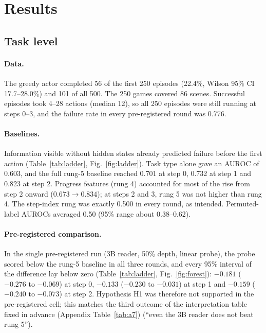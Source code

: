 \documentclass[11pt]{article}
\begin{document}
\section{Results}
\subsection{Task level}\label{sec:task}
\paragraph{Data.} The greedy actor completed 56 of the first 250 episodes (22.4\%, Wilson 95\% CI 17.7--28.0\%) and 101 of all 500.
The 250 games covered 86 scenes. Successful episodes took 4--28 actions (median 12), so all 250 episodes were still running at steps 0--3,
and the failure rate in every pre-registered round was 0.776.

\paragraph{Baselines.} Information visible without hidden states already predicted failure before the first action (Table~\ref{tab:ladder}, Fig.~\ref{fig:ladder}).
Task type alone gave an AUROC of 0.603, and the full rung-5 baseline reached 0.701 at step 0, 0.732 at step 1 and 0.823 at step 2.
Progress features (rung 4) accounted for most of the rise from step 2 onward ($0.673 \rightarrow 0.834$); at steps 2 and 3, rung 5 was not higher than rung 4.
The step-index rung was exactly 0.500 in every round, as intended. Permuted-label AUROCs averaged 0.50 (95\% range about 0.38--0.62).

\paragraph{Pre-registered comparison.} In the single pre-registered run (3B reader, 50\% depth, linear probe), the probe scored below the rung-5 baseline in all three rounds,
and every 95\% interval of the difference lay below zero (Table~\ref{tab:ladder}, Fig.~\ref{fig:forest}): $-0.181$ ($-0.276$ to $-0.069$) at step 0, $-0.133$ ($-0.230$ to $-0.031$) at step 1 and
$-0.159$ ($-0.240$ to $-0.073$) at step 2. Hypothesis H1 was therefore not supported in the pre-registered cell; this matches the third outcome of the interpretation table fixed in advance (Appendix Table~\ref{tab:a7})
(``even the 3B reader does not beat rung 5'').
\end{document}
